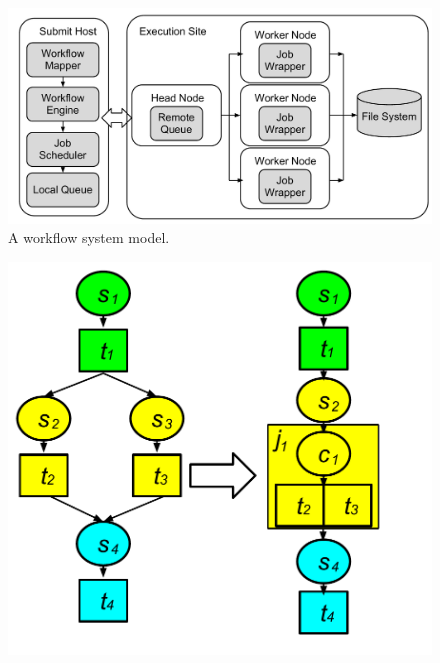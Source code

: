 \begin{figure}[htb]
\centering
  \includegraphics[width=0.95\linewidth]{figures/model/execution.pdf}
  \caption{A workflow system model.}
  \label{fig:model_system}
  \vspace{-15pt}
\end{figure}

\begin{figure}[!htb]
\centering
 \includegraphics[width=0.65\linewidth]{figures/model/hc_color.pdf}
  \label{fig:model_hc}
  \vspace{-15pt}
\end{figure}

